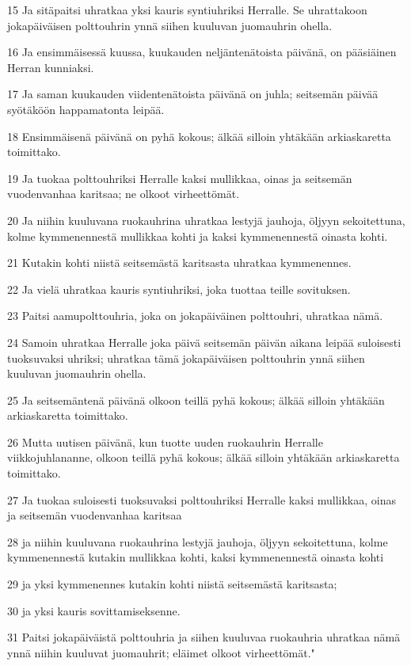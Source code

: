 \par 15 Ja sitäpaitsi uhratkaa yksi kauris syntiuhriksi Herralle. Se uhrattakoon jokapäiväisen polttouhrin ynnä siihen kuuluvan juomauhrin ohella.
\par 16 Ja ensimmäisessä kuussa, kuukauden neljäntenätoista päivänä, on pääsiäinen Herran kunniaksi.
\par 17 Ja saman kuukauden viidentenätoista päivänä on juhla; seitsemän päivää syötäköön happamatonta leipää.
\par 18 Ensimmäisenä päivänä on pyhä kokous; älkää silloin yhtäkään arkiaskaretta toimittako.
\par 19 Ja tuokaa polttouhriksi Herralle kaksi mullikkaa, oinas ja seitsemän vuodenvanhaa karitsaa; ne olkoot virheettömät.
\par 20 Ja niihin kuuluvana ruokauhrina uhratkaa lestyjä jauhoja, öljyyn sekoitettuna, kolme kymmenennestä mullikkaa kohti ja kaksi kymmenennestä oinasta kohti.
\par 21 Kutakin kohti niistä seitsemästä karitsasta uhratkaa kymmenennes.
\par 22 Ja vielä uhratkaa kauris syntiuhriksi, joka tuottaa teille sovituksen.
\par 23 Paitsi aamupolttouhria, joka on jokapäiväinen polttouhri, uhratkaa nämä.
\par 24 Samoin uhratkaa Herralle joka päivä seitsemän päivän aikana leipää suloisesti tuoksuvaksi uhriksi; uhratkaa tämä jokapäiväisen polttouhrin ynnä siihen kuuluvan juomauhrin ohella.
\par 25 Ja seitsemäntenä päivänä olkoon teillä pyhä kokous; älkää silloin yhtäkään arkiaskaretta toimittako.
\par 26 Mutta uutisen päivänä, kun tuotte uuden ruokauhrin Herralle viikkojuhlananne, olkoon teillä pyhä kokous; älkää silloin yhtäkään arkiaskaretta toimittako.
\par 27 Ja tuokaa suloisesti tuoksuvaksi polttouhriksi Herralle kaksi mullikkaa, oinas ja seitsemän vuodenvanhaa karitsaa
\par 28 ja niihin kuuluvana ruokauhrina lestyjä jauhoja, öljyyn sekoitettuna, kolme kymmenennestä kutakin mullikkaa kohti, kaksi kymmenennestä oinasta kohti
\par 29 ja yksi kymmenennes kutakin kohti niistä seitsemästä karitsasta;
\par 30 ja yksi kauris sovittamiseksenne.
\par 31 Paitsi jokapäiväistä polttouhria ja siihen kuuluvaa ruokauhria uhratkaa nämä ynnä niihin kuuluvat juomauhrit; eläimet olkoot virheettömät."

